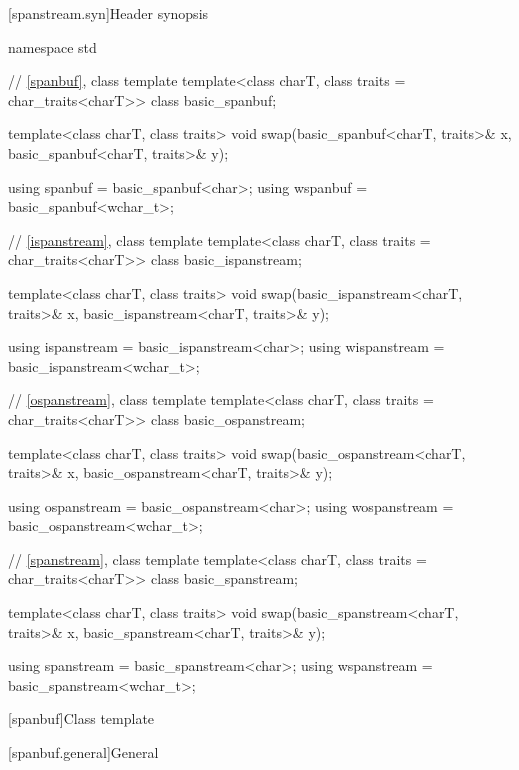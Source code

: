 [spanstream.syn]{Header  synopsis}

%
%
%
%
%
%
%
%
\begin{codeblock}
namespace std {
  // \ref{spanbuf}, class template 
  template<class charT, class traits = char_traits<charT>>
    class basic_spanbuf;

  template<class charT, class traits>
    void swap(basic_spanbuf<charT, traits>& x, basic_spanbuf<charT, traits>& y);

  using spanbuf = basic_spanbuf<char>;
  using wspanbuf = basic_spanbuf<wchar_t>;

  // \ref{ispanstream}, class template 
  template<class charT, class traits = char_traits<charT>>
    class basic_ispanstream;

  template<class charT, class traits>
    void swap(basic_ispanstream<charT, traits>& x, basic_ispanstream<charT, traits>& y);

  using ispanstream = basic_ispanstream<char>;
  using wispanstream = basic_ispanstream<wchar_t>;

  // \ref{ospanstream}, class template 
  template<class charT, class traits = char_traits<charT>>
    class basic_ospanstream;

  template<class charT, class traits>
    void swap(basic_ospanstream<charT, traits>& x, basic_ospanstream<charT, traits>& y);

  using ospanstream = basic_ospanstream<char>;
  using wospanstream = basic_ospanstream<wchar_t>;

  // \ref{spanstream}, class template 
  template<class charT, class traits = char_traits<charT>>
    class basic_spanstream;

  template<class charT, class traits>
    void swap(basic_spanstream<charT, traits>& x, basic_spanstream<charT, traits>& y);

  using spanstream = basic_spanstream<char>;
  using wspanstream = basic_spanstream<wchar_t>;
}
\end{codeblock}

[spanbuf]{Class template }

[spanbuf.general]{General}


